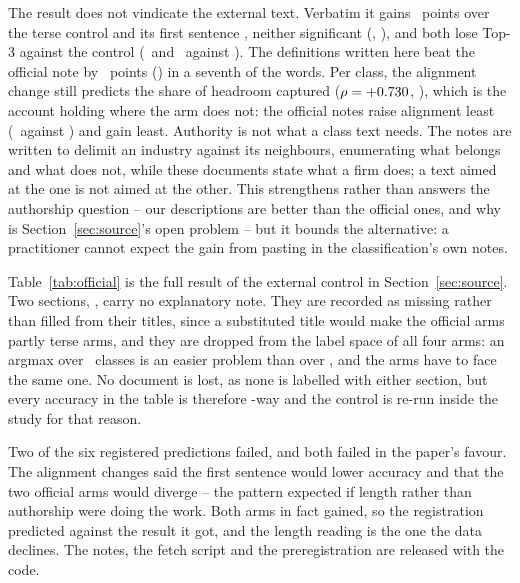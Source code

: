\documentclass[11pt]{article}
\begin{document}
The result does not vindicate the external text. Verbatim it gains
\OfficialFullGain~points over the terse control and its first sentence
\OfficialSentenceGain, neither significant (\OfficialFullPStat,
\OfficialSentencePStat), and both lose Top-3 against the control
(\OfficialFullTopThree\ and \OfficialSentenceTopThree\ against
\OfficialControlTopThree). The definitions written here beat the official note
by \OfficialAssistantOverFull~points (\OfficialAssistantOverFullPStat) in a
seventh of the words. Per class, the alignment change still predicts the share
of headroom captured ($\rho = +0.730$, \OfficialRhoPStat), which is the
account holding where the arm does not: the official notes raise alignment
least (\OfficialFullAlign\ against \OfficialAssistantAlign) and gain least.
Authority is not what a class text needs. The notes are written to delimit an
industry against its neighbours, enumerating what belongs and what does not,
while these documents state what a firm does; a text aimed at the one is not
aimed at the other. This strengthens rather than answers the authorship
question -- our descriptions are better than the official ones, and why is
Section~\ref{sec:source}'s open problem -- but it bounds the alternative: a
practitioner cannot expect the gain from pasting in the classification's own
notes.

Table~\ref{tab:official} is the full result of the external control in
Section~\ref{sec:source}. Two sections, \OfficialDropped, carry no explanatory
note. They are recorded as missing rather than filled from their titles, since
a substituted title would make the official arms partly terse arms, and they
are dropped from the label space of all four arms: an argmax over
\OfficialClasses\ classes is an easier problem than over \NSections, and the
arms have to face the same one. No document is lost, as none is labelled with
either section, but every accuracy in the table is therefore
\OfficialClasses-way and the control is re-run inside the study for that
reason.

Two of the six registered predictions failed, and both failed in the paper's
favour. The alignment changes said the first sentence would lower accuracy and
that the two official arms would diverge -- the pattern expected if length
rather than authorship were doing the work. Both arms in fact gained, so the
registration predicted against the result it got, and the length reading is the
one the data declines. The notes, the fetch script and the preregistration are
released with the code.


\end{document}
